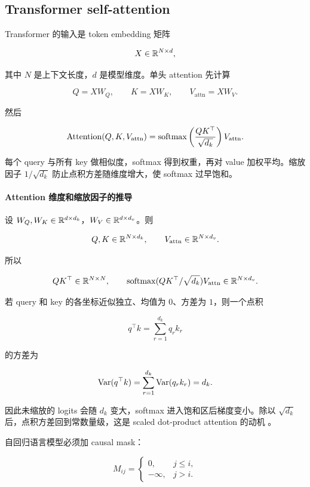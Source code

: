 \subsection{Transformer self-attention}


Transformer 的输入是 token embedding 矩阵

\[
  X\in\mathbb{R}^{N\times d},
\]

其中 \(N\) 是上下文长度，\(d\) 是模型维度。单头 attention 先计算

\[
  Q=XW_Q,
  \qquad
  K=XW_K,
  \qquad
  V_{\mathrm{attn}}=XW_V.
\]

然后

\[
  \operatorname{Attention}(Q,K,V_{\mathrm{attn}})
  =
  \operatorname{softmax}
  \left(
    \frac{QK^\top}{\sqrt{d_k}}
  \right)V_{\mathrm{attn}}.
\]

每个 query 与所有 key 做相似度，softmax 得到权重，再对 value 加权平均。缩放因子 \(1/\sqrt{d_k}\) 防止点积方差随维度增大，使 softmax 过早饱和。

\paragraph{Attention 维度和缩放因子的推导}

设 \(W_Q,W_K\in\mathbb{R}^{d\times d_k}\)，\(W_V\in\mathbb{R}^{d\times d_v}\)。则

\[
  Q,K\in\mathbb{R}^{N\times d_k},
  \qquad
  V_{\mathrm{attn}}\in\mathbb{R}^{N\times d_v}.
\]

所以

\[
  QK^\top\in\mathbb{R}^{N\times N},
  \qquad
  \operatorname{softmax}(QK^\top/\sqrt{d_k})V_{\mathrm{attn}}\in\mathbb{R}^{N\times d_v}.
\]

若 query 和 key 的各坐标近似独立、均值为 \(0\)、方差为 \(1\)，则一个点积

\[
  q^\top k=\sum_{r=1}^{d_k}q_r k_r
\]

的方差为

\[
  \operatorname{Var}(q^\top k)
  =
  \sum_{r=1}^{d_k}\operatorname{Var}(q_r k_r)
  =
  d_k.
\]

因此未缩放的 logits 会随 \(d_k\) 变大，softmax 进入饱和区后梯度变小。除以 \(\sqrt{d_k}\) 后，点积方差回到常数量级，这是 scaled dot-product attention 的动机 \parencite{vaswani2017attention,jurafsky2026slp}。

自回归语言模型必须加 causal mask：

\[
  M_{ij}
  =
  \begin{cases}
    0, & j\le i,\\
    -\infty, & j>i.
  \end{cases}
\]


